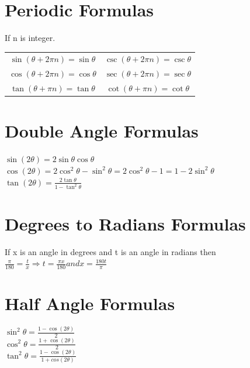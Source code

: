 \documentclass[10pt,onecolumn]{article}
\begin{document}
{%
\section{Periodic Formulas}
If n is integer.
\begin{tabular}{c|c}
\(\sin(\theta + 2\pi n) = \sin \theta\) & \(\csc(\theta + 2\pi n) = \csc \theta\)\\
\(\cos(\theta + 2\pi n) = \cos \theta\) & \(\sec(\theta + 2\pi n) = \sec \theta\)\\
\(\tan(\theta + \pi n) = \tan \theta\) & \(\cot(\theta + \pi n) = \cot \theta\) \\
\end{tabular}


\section{Double Angle Formulas}

\(\sin(2\theta) = 2\sin \theta \cos \theta\) \\
\(\cos(2\theta) = 2\cos^2 \theta - \sin^2 \theta = 2\cos^2 \theta - 1 = 1 - 2\sin^2 \theta\) \\
\(\tan(2\theta) = \frac{2\tan \theta}{1 - \tan^2 \theta}\) \\

\section{Degrees to Radians Formulas}

If x is an angle in degrees and t is an angle in radians then \\
\(\frac{\pi}{180} = \frac{t}{x} \Rightarrow t = \frac{\pi x}{180} and x = \frac{180t}{\pi}\) \\

\section{Half Angle Formulas}

\(\sin^2 \theta = \frac{1 - \cos(2\theta)}{2}\) \\
\(\cos^2 \theta = \frac{1 + \cos(2\theta)}{2}\) \\
\(\tan^2 \theta = \frac{1 - \cos(2\theta)}{1 + cos(2\theta)}\) \\

}
\end{document}
